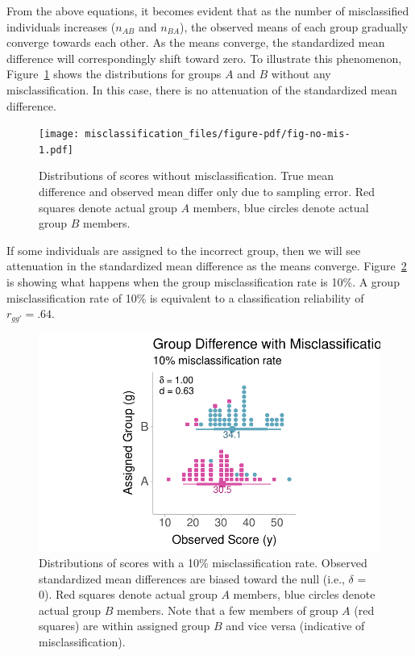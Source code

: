 \documentclass[
  letterpaper,
  DIV=11,
  numbers=noendperiod]{scrreprt}
\begin{document}
From the above equations, it becomes evident that as the number of
misclassified individuals increases (\(n_{AB}\) and \(n_{BA}\)), the
observed means of each group gradually converge towards each other. As
the means converge, the standardized mean difference will
correspondingly shift toward zero. To illustrate this phenomenon,
Figure~\ref{fig-no-mis} shows the distributions for groups \(A\) and
\(B\) without any misclassification. In this case, there is no
attenuation of the standardized mean difference.

\begin{figure}[H]

{\centering \texttt{[image: misclassification\_files/figure-pdf/fig-no-mis-1.pdf]}

}

\caption{\label{fig-no-mis}Distributions of scores without
misclassification. True mean difference and observed mean differ only
due to sampling error. Red squares denote actual group \(A\) members,
blue circles denote actual group \(B\) members.}

\end{figure}

If some individuals are assigned to the incorrect group, then we will
see attenuation in the standardized mean difference as the means
converge. Figure~\ref{fig-mis} is showing what happens when the group
misclassification rate is 10\%. A group misclassification rate of 10\%
is equivalent to a classification reliability of \(r_{gg'}=.64\).

\begin{figure}[H]

{\centering \includegraphics{misclassification_files/figure-pdf/fig-mis-1.pdf}

}

\caption{\label{fig-mis}Distributions of scores with a 10\%
misclassification rate. Observed standardized mean differences are
biased toward the null (i.e., \(\delta\) = 0). Red squares denote actual
group \(A\) members, blue circles denote actual group \(B\) members.
Note that a few members of group \(A\) (red squares) are within assigned
group \(B\) and vice versa (indicative of misclassification).}

\end{figure}
\end{document}
